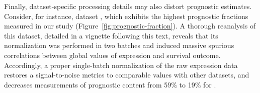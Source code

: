 
Finally, dataset-specific processing details may also distort prognostic
estimates.  Consider, for instance, dataset , which exhibits
the highest prognostic fractions measured in our study
(Figure~\ref{fig:prognostic-fraction}).  A thorough reanalysis of this dataset,
detailed in a vignette following this text, reveals that its normalization was
performed in two batches and induced massive spurious correlations between
global values of expression and survival outcome.  Accordingly, a proper
single-batch normalization of the raw expression data restores a signal-to-noise
metrics to comparable values with other datasets, and decreases measurements of
prognostic content from 59\% to 19\% for .

